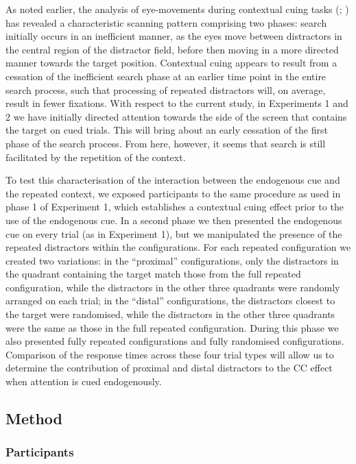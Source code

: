 \documentclass[
  man,
  floatsintext,
  longtable,
  nolmodern,
  notxfonts,
  notimes,
  colorlinks=true,linkcolor=blue,citecolor=blue,urlcolor=blue]{apa7}
\begin{document}
As noted earlier, the analysis of eye-movements during contextual cuing
tasks (;
) has revealed a
characteristic scanning pattern comprising two phases: search initially
occurs in an inefficient manner, as the eyes move between distractors in
the central region of the distractor field, before then moving in a more
directed manner towards the target position. Contextual cuing appears to
result from a cessation of the inefficient search phase at an earlier
time point in the entire search process, such that processing of
repeated distractors will, on average, result in fewer fixations. With
respect to the current study, in Experiments 1 and 2 we have initially
directed attention towards the side of the screen that contains the
target on cued trials. This will bring about an early cessation of the
first phase of the search process. From here, however, it seems that
search is still facilitated by the repetition of the context.

To test this characterisation of the interaction between the endogenous
cue and the repeated context, we exposed participants to the same
procedure as used in phase 1 of Experiment 1, which establishes a
contextual cuing effect prior to the use of the endogenous cue. In a
second phase we then presented the endogenous cue on every trial (as in
Experiment 1), but we manipulated the presence of the repeated
distractors within the configurations. For each repeated configuration
we created two variations: in the ``proximal'' configurations, only the
distractors in the quadrant containing the target match those from the
full repeated configuration, while the distractors in the other three
quadrants were randomly arranged on each trial; in the ``distal''
configurations, the distractors closest to the target were randomised,
while the distractors in the other three quadrants were the same as
those in the full repeated configuration. During this phase we also
presented fully repeated configurations and fully randomised
configurations. Comparison of the response times across these four trial
types will allow us to determine the contribution of proximal and distal
distractors to the CC effect when attention is cued endogenously.

\subsection{Method}\label{method-2}

\subsubsection{Participants}\label{participants-2}
\end{document}
